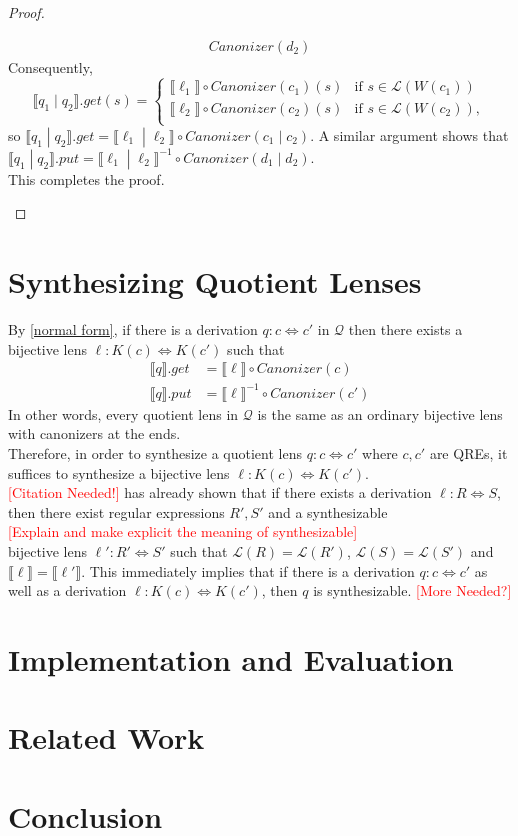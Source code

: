 \documentclass{svproc}
\begin{document}
\begin{proof}
\begin{enumerate}
\begin{align*}
Canonizer(d_2)
\end{align*}
Consequently,
$$
  \llbracket q_1 \; | \; q_2 \rrbracket.get(s) = 
  \begin{cases}
  \llbracket \ell_1 \rrbracket \circ
Canonizer(c_1) (s) & \text{if } s \in \mathcal{L}(W(c_1))\\
  \llbracket \ell_2 \rrbracket \circ
Canonizer(c_2) (s) & \text{if } s \in \mathcal{L}(W(c_2)),\\
  \end{cases}$$
  so $\llbracket q_1 \; | \; q_2 \rrbracket.get = \llbracket \ell_1 \; | \;
  \ell_2 \rrbracket \circ Canonizer(c_1 \; | \; c_2)$. A similar argument shows
  that $\llbracket q_1 \; | \; q_2 \rrbracket.put = \llbracket \ell_1 \; | \;
  \ell_2 \rrbracket^{-1} \circ Canonizer(d_1 \; | \; d_2)$.\\
  This completes the proof.
\end{enumerate}
\end{proof}
\section{Synthesizing Quotient Lenses}
By \cref{normal form}, if there is a derivation $q : c \Leftrightarrow c'$ in
$\mathcal{Q}$ then there exists a bijective lens $\ell : K(c) \Leftrightarrow
K(c')$ such that
\begin{align*}
\llbracket q \rrbracket.get &= \llbracket \ell \rrbracket\circ Canonizer(c)\\
\llbracket q \rrbracket.put &= \llbracket \ell \rrbracket^{-1} \circ
Canonizer(c')
\end{align*}
In other words, every quotient lens in $\mathcal{Q}$ is the same as an ordinary
bijective lens with canonizers at the ends.\\
Therefore, in order to synthesize a quotient lens $q: c \Leftrightarrow c'$
where $c, c'$ are QREs, it suffices to synthesize a bijective lens $\ell : K(c)
\Leftrightarrow K(c')$.\\
\textcolor{red}{[Citation Needed!]} has already shown that if there
exists a derivation $\ell : R \Leftrightarrow S$, then there exist
regular expressions $R', S'$ and a synthesizable \\
\textcolor{red}{[Explain and make explicit the meaning
of synthesizable]} \\
bijective lens $\ell' :
R' \Leftrightarrow S'$ such that $\mathcal{L}(R) = \mathcal{L}(R')$,
$\mathcal{L}(S) = \mathcal{L}(S')$ and $\llbracket \ell \rrbracket =
\llbracket \ell' \rrbracket$. This immediately implies that if there is a
derivation $q : c \Leftrightarrow c'$ as well as a derivation $\ell : K(c)
\Leftrightarrow K(c')$, then $q$ is synthesizable.
\textcolor{red}{[More Needed?]}
\section{Implementation and Evaluation}
\section{Related Work}

\section{Conclusion}
\end{document}
